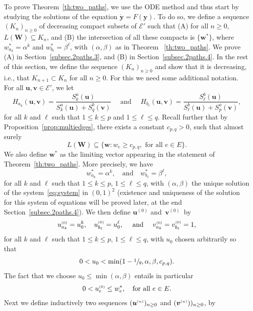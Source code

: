 \documentclass[11pt]{article}
\newcommand{\ie}{i.e.,\xspace}
\let\mathcal\mathscr
\let \nicefrac\sfrac
\newcommand{\bW}{\boldsymbol{W}}
\numberwithin{equation}{section}
\theoremstyle{definition}
\let\bs\boldsymbol
\newcommand{\sss}{\ensuremath{\scriptscriptstyle}}
\begin{document}
To prove Theorem~\ref{th:two_paths}, we use the ODE method and thus start by studying the solutions of the equation ${\bs{\dot y}} =F({\bs y})$. To do so, we define a sequence $(K_n)_{n\geq 0}$ of decreasing compact subsets of $\mathcal E'$ such that (A) for all $n\geq 0$, $L(\bW)\subseteq K_n$, and (B) the intersection of all these compacts is $\{\bs w^*\}$, where $w_{a_k}^* = \alpha^k$ and $w_{b_\ell}^* = \beta^\ell$, with $(\alpha, \beta)$ as in Theorem ~\ref{th:two_paths}.
We prove (A) in Section~\eqref{subsec.2paths.3}, and (B) in Section~\ref{subsec.2paths.4}.
In the rest of this section, we define the sequence $(K_n)_{n\geq 0}$ and show that it is decreasing,
\ie that $K_{n+1} \subset K_n$ for all $n\ge 0$.
For this we need some additional notation.
For all $\bs u,\bs v \in \mathcal E'$, we let
\[
H_{a_k}(\bs u,\bs v)
= \frac{S^a_k(\bs u)}{S^a_k(\bs u)+S^b_q(\bs v)}
\quad\text{ and }\quad
H_{b_\ell}(\bs u,\bs v)
= \frac{S^b_\ell(\bs u)}{S^b_\ell(\bs u)+S^a_p(\bs v)},
\]
for all $k$ and $\ell$ such that $1\leq k\leq p$ and $1\leq \ell\leq q$.
Recall further that by Proposition~\ref{prop:multiedges}, there exists a constant $c_{p,q}>0$, such that almost surely
\begin{equation}\label{K0def}
L(\bW) \subseteq \{\bs w\colon w_e\ge c_{p,q}, \text{ for all }e\in E\}.
\end{equation}
{We also define $\bs w^*$ as the limiting vector appearing in the statement of Theorem~\ref{th:two_paths}. More precisely, we have }
\begin{equation}\label{w*}
{w_{a_k}^* = \alpha^k, \quad \text{and} \quad w_{b_\ell}^* = \beta^\ell,}
\end{equation}
{for all $k$ and $\ell$ such that  $1\le k\le p$, $1\le \ell \le q$, with $(\alpha,\beta)$ the unique solution of the system~\eqref{eq:system} in $(0,1)^2$ (existence and {uniqueness} of the solution for this system of equations will be proved later, at the end Section~\ref{subsec.2paths.4}).}
We then define $\bs u^{(0)}$ and~$\bs v^{(0)}$~by
\[
u^{\sss (0)}_{a_k}=u_0^k, \quad
u^{\sss (0)}_{b_\ell}=u_0^\ell,\quad \text{ and }\quad
v^{\sss (0)}_{a_k}=v^{\sss (0)}_{b_\ell}=1,
\]
for all $k$ and $\ell$ such that  $1\le k\le p$, $1\le \ell \le q$, with $u_0$ chosen arbitrarily so that
\[
0< u_0<\min(1-\nicefrac1q,\alpha,\beta,c_{p,q}).
\]
The fact that we choose $u_0\le \min(\alpha,\beta)$ entails in particular
\[
0< u^{\sss (0)}_e\leq w^*_e, \quad \text{for all }e\in E.
\]
Next we define inductively two sequences $(\bs u^{\sss (n)})_{n\ge 0}$ and $(\bs v^{\sss (n)}))_{n\ge 0}$, by
\end{document}
